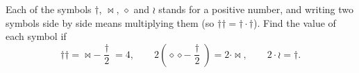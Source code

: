 Each of the symbols $\dagger$, $\bowtie$, $\diamond$ and $\wr$ stands for a positive number, and writing two symbols side by side means multiplying them (so $\dagger\dagger=\dagger\cdot\dagger$). Find the value of each symbol if
\[\dagger\dagger=\bowtie-\dfrac{\dagger}{2}=4,\qquad 2\left(\diamond\diamond-\dfrac{\dagger}{2}\right)=2\cdot\bowtie,\qquad 2\cdot\wr=\dagger.\]
